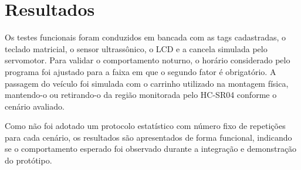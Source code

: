 \documentclass[11pt,a4paper]{article}
\begin{document}
\section{Resultados}

Os testes funcionais foram conduzidos em bancada com as tags cadastradas, o
teclado matricial, o sensor ultrassônico, o LCD e a cancela simulada pelo
servomotor. Para validar o comportamento noturno, o horário considerado pelo
programa foi ajustado para a faixa em que o segundo fator é obrigatório. A
passagem do veículo foi simulada com o carrinho utilizado na montagem física,
mantendo-o ou retirando-o da região monitorada pelo HC-SR04 conforme o cenário
avaliado.

Como não foi adotado um protocolo estatístico com número fixo de repetições para
cada cenário, os resultados são apresentados de forma funcional, indicando se o
comportamento esperado foi observado durante a integração e demonstração do
protótipo.
\end{document}
